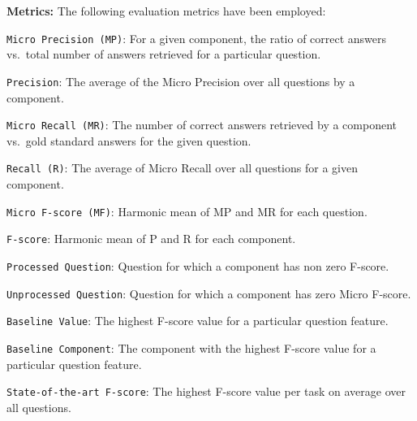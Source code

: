 \documentclass[sigconf,edbt]{acmart-edbt2019}
\newcommand{\jlt}[1]{\todo[inline, color=cyan]{JL: #1}}
\begin{document}
{\bf Metrics:} The following evaluation metrics have been employed: \begin{inparaenum}
\item \texttt{Micro Precision (MP)}: For a given component, the ratio of correct answers vs.\ total number of answers retrieved for a particular question.
\item \texttt{Precision}: The average of the Micro Precision over all questions by a component.
\item \texttt {Micro~Recall~(MR)}: The number of correct answers retrieved by a component vs.\ gold standard answers for the given question.
\item \texttt{Recall~(R)}: The average of Micro Recall over all questions for a given component.
\item \texttt{Micro~F-score~(MF)}: Harmonic mean of MP and MR for each question.
\item \texttt{F-score}: Harmonic mean of P and R for each component.
\item \texttt{Processed Question}: Question for which a component has non zero F-score.
\item \texttt{Unprocessed Question}: Question for which a component has zero Micro F-score.
\item \texttt{Baseline Value}: The highest F-score value for a particular question feature. 
\item \texttt{Baseline Component}: The component with the highest F-score value for a particular question feature.
\item \texttt{State-of-the-art F-score}: The highest F-score value per task on average over all questions.
\end{inparaenum}
\noindent
\end{document}
